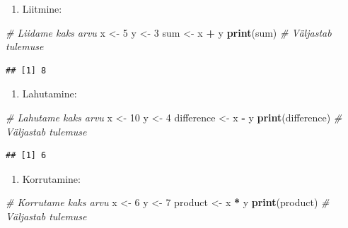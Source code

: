 \documentclass[
]{book}
\newenvironment{Shaded}{\begin{snugshade}}{\end{snugshade}}
\newcommand{\CommentTok}[1]{\textcolor[rgb]{0.56,0.35,0.01}{\textit{#1}}}
\newcommand{\DecValTok}[1]{\textcolor[rgb]{0.00,0.00,0.81}{#1}}
\newcommand{\FunctionTok}[1]{\textcolor[rgb]{0.13,0.29,0.53}{\textbf{#1}}}
\newcommand{\NormalTok}[1]{#1}
\newcommand{\OtherTok}[1]{\textcolor[rgb]{0.56,0.35,0.01}{#1}}
\newcommand{\SpecialCharTok}[1]{\textcolor[rgb]{0.81,0.36,0.00}{\textbf{#1}}}
\providecommand{\tightlist}{%
  \setlength{\itemsep}{0pt}\setlength{\parskip}{0pt}}
\renewenvironment{Shaded} {\begin{snugshade}\footnotesize} {\end{snugshade}}
\begin{document}
\begin{enumerate}
\def\labelenumi{\arabic{enumi}.}
\tightlist
\item
  Liitmine:
\end{enumerate}

\begin{Shaded}
\begin{Highlighting}[]
\CommentTok{\# Liidame kaks arvu}
\NormalTok{x }\OtherTok{\textless{}{-}} \DecValTok{5}
\NormalTok{y }\OtherTok{\textless{}{-}} \DecValTok{3}
\NormalTok{sum }\OtherTok{\textless{}{-}}\NormalTok{ x }\SpecialCharTok{+}\NormalTok{ y}
\FunctionTok{print}\NormalTok{(sum) }\CommentTok{\# Väljastab tulemuse}
\end{Highlighting}
\end{Shaded}

\begin{verbatim}
## [1] 8
\end{verbatim}

\begin{enumerate}
\def\labelenumi{\arabic{enumi}.}
\setcounter{enumi}{1}
\tightlist
\item
  Lahutamine:
\end{enumerate}

\begin{Shaded}
\begin{Highlighting}[]
\CommentTok{\# Lahutame kaks arvu}
\NormalTok{x }\OtherTok{\textless{}{-}} \DecValTok{10}
\NormalTok{y }\OtherTok{\textless{}{-}} \DecValTok{4}
\NormalTok{difference }\OtherTok{\textless{}{-}}\NormalTok{ x }\SpecialCharTok{{-}}\NormalTok{ y}
\FunctionTok{print}\NormalTok{(difference) }\CommentTok{\# Väljastab tulemuse}
\end{Highlighting}
\end{Shaded}

\begin{verbatim}
## [1] 6
\end{verbatim}

\begin{enumerate}
\def\labelenumi{\arabic{enumi}.}
\setcounter{enumi}{2}
\tightlist
\item
  Korrutamine:
\end{enumerate}

\begin{Shaded}
\begin{Highlighting}[]
\CommentTok{\# Korrutame kaks arvu}
\NormalTok{x }\OtherTok{\textless{}{-}} \DecValTok{6}
\NormalTok{y }\OtherTok{\textless{}{-}} \DecValTok{7}
\NormalTok{product }\OtherTok{\textless{}{-}}\NormalTok{ x }\SpecialCharTok{*}\NormalTok{ y}
\FunctionTok{print}\NormalTok{(product) }\CommentTok{\# Väljastab tulemuse}
\end{Highlighting}
\end{Shaded}
\end{document}

